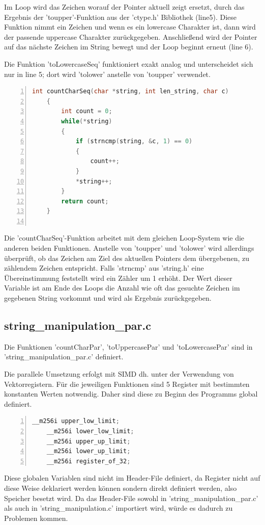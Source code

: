 \documentclass[plainarticle,zihtitle,german,final,hyperref,utf8]{zihpub}
\begin{document}
Im Loop wird das Zeichen worauf der Pointer aktuell zeigt ersetzt, durch das Ergebnis der 'toupper'-Funktion aus der 'ctype.h' Bibliothek (line5). Diese Funktion nimmt ein Zeichen und wenn es ein lowercase Charakter ist, dann wird der passende uppercase Charakter zurückgegeben. Anschließend wird der Pointer auf das nächste Zeichen im String bewegt und der Loop beginnt erneut (line 6).

Die Funktion 'toLowercaseSeq' funktioniert exakt analog und unterscheidet sich nur in line 5; dort wird 'tolower' anstelle von 'toupper' verwendet.

\begin{lstlisting}[language=c, numbers=left]
	int countCharSeq(char *string, int len_string, char c)
	{
		int count = 0;
		while(*string)
		{
			if (strncmp(string, &c, 1) == 0)
			{
				count++;
			}
			*string++;
		}
		return count;
	}
	
\end{lstlisting}

Die 'countCharSeq'-Funktion arbeitet mit dem gleichen Loop-System wie die anderen beiden Funktionen. Anstelle von 'toupper' und 'tolower' wird allerdings überprüft, ob das Zeichen am Ziel des aktuellen Pointers dem übergebenen, zu zählendem Zeichen entspricht. Falls 'strncmp' aus 'string.h' eine Übereinstimmung feststellt wird ein Zähler um 1 erhöht. Der Wert dieser Variable ist am Ende des Loops die Anzahl wie oft das gesuchte Zeichen im gegebenen String vorkommt und wird als Ergebnis zurückgegeben.


\subsection{string\_manipulation\_par.c}\label{subsec:par}
Die Funktionen 'countCharPar', 'toUppercasePar' und 'toLowercasePar' sind in 'string\_manipulation\_par.c' definiert.

Die parallele Umsetzung erfolgt mit SIMD dh. unter der Verwendung von Vektorregistern. Für die jeweiligen Funktionen sind 5 Register mit bestimmten konstanten Werten notwendig. Daher sind diese zu Beginn des Programms global definiert.
\begin{lstlisting}[language=c, numbers=left]
	__m256i upper_low_limit;
	__m256i lower_low_limit;
	__m256i upper_up_limit;
	__m256i lower_up_limit;
	__m256i register_of_32;
\end{lstlisting}

Diese globalen Variablen sind nicht im Header-File definiert, da Register nicht auf diese Weise deklariert werden können sondern direkt definiert werden, also Speicher besetzt wird. Da das Header-File sowohl in 'string\_manipulation\_par.c' als auch in 'string\_manipulation.c' importiert wird, würde es dadurch zu Problemen kommen. %
\end{document}
